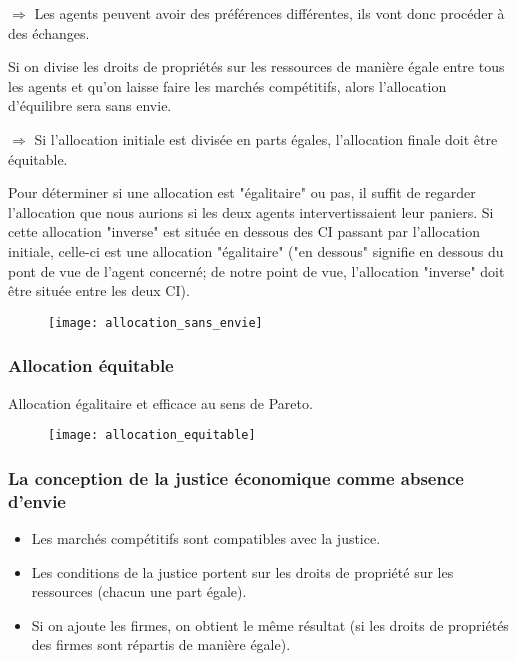 $\Rightarrow$ Les agents peuvent avoir des préférences différentes, ils vont donc procéder à des échanges.
\begin{formal}
Si on divise les droits de propriétés sur les ressources de manière égale entre tous les agents et qu'on laisse faire les marchés compétitifs, alors l'allocation d'équilibre sera sans envie.
\end{formal}
$\Rightarrow$ Si l'allocation initiale est divisée en parts égales, l'allocation finale doit être équitable.

Pour déterminer si une allocation est "égalitaire" ou pas, il suffit de regarder l'allocation que nous aurions si les deux agents intervertissaient leur paniers. Si cette allocation "inverse" est située en dessous des CI passant par l'allocation initiale, celle-ci est une allocation "égalitaire" ("en dessous" signifie en dessous du pont de vue de l'agent concerné; de notre point de vue, l'allocation "inverse" doit être située entre les deux CI).

\begin{figure}[H]
	\centering
	\texttt{[image: allocation\_sans\_envie]}
\end{figure}

\newpage
\subsubsection{Allocation équitable}

Allocation égalitaire et efficace au sens de Pareto.

\begin{figure}[H]
	\centering
	\texttt{[image: allocation\_equitable]}
\end{figure}

\subsubsection{La conception de la justice économique comme absence d'envie}

\begin{itemize}
\item Les marchés compétitifs sont compatibles avec la justice.
\item Les conditions de la justice portent sur les droits de propriété sur les ressources (chacun une part égale).
\item Si on ajoute les firmes, on obtient le même résultat (si les droits de propriétés des firmes sont répartis de manière égale).
\end{itemize}

